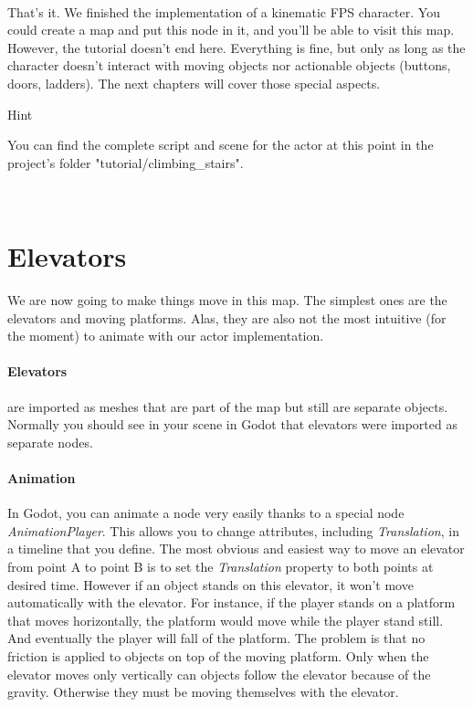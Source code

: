 \documentclass[10pt,a4paper]{article}
\newenvironment{hint}{%
\begin{bclogo}[logo=\bcinfo, couleurBarre=Green, noborder=true, 
               couleur=white]{Hint}
}{%
\end{bclogo}\hspace{1px}\\
}
\begin{document}
\\
That's it. We finished the implementation of a kinematic FPS character. You could create a map and put this node in it, and you'll be able to visit this map.\\
However, the tutorial doesn't end here. Everything is fine, but only as long as the character doesn't interact with moving objects nor actionable objects (buttons, doors, ladders). The next chapters will cover those special aspects.

\begin{hint}
You can find the complete script and scene for the actor at this point in the project's folder "tutorial/climbing\_stairs".
\end{hint}


\section{Elevators}
We are now going to make things move in this map. The simplest ones are the elevators and moving platforms. Alas, they are also not the most intuitive (for the moment) to animate with our actor implementation.

\paragraph{Elevators} are imported as meshes that are part of the map but still are separate objects. Normally you should see in your scene in Godot that elevators were imported as separate nodes. 

\paragraph{Animation} In Godot, you can animate a node very easily thanks to a special node \textit{AnimationPlayer}. This allows you to change attributes, including \textit{Translation}, in a timeline that you define. The most obvious and easiest way to move an elevator from point A to point B is to set the \textit{Translation} property to both points at desired time. However if an object stands on this elevator, it won't move automatically with the elevator. For instance, if the player stands on a platform that moves horizontally, the platform would move while the player stand still. And eventually the player will fall of the platform. The problem is that no friction is applied to objects on top of the moving platform. Only when the elevator moves only vertically can objects follow the elevator because of the gravity. Otherwise they must be moving themselves with the elevator.
\end{document}
